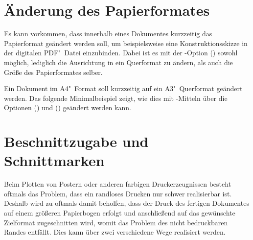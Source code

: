 \section{Änderung des Papierformates}
%
%
Es kann vorkommen, dass innerhalb eines Dokumentes kurzzeitig das Papierformat 
geändert werden soll, um beispielsweise eine Konstruktionsskizze in der 
digitalen PDF"~Datei einzubinden. Dabei ist es mit der \KOMAScript-Option 
() sowohl möglich, lediglich die 
Ausrichtung in ein Querformat zu ändern, als auch die Größe des Papierformates 
selber.
%
\begin{Example}
Ein Dokument im A4"~Format soll kurzzeitig auf ein A3"~Querformat geändert 
werden. Das folgende Minimalbeispiel zeigt, wie dies mit \KOMAScript-Mitteln 
über die Optionen () und 
() geändert werden kann.
\end{Example}



\section{Beschnittzugabe und Schnittmarken}
%
%
%
%
Beim Plotten von Postern oder anderen farbigen Druckerzeugnissen besteht 
oftmals das Problem, dass ein randloses Drucken nur schwer realisierbar ist. 
Deshalb wird zu oftmals damit beholfen, dass der Druck des fertigen Dokumentes 
auf einem größeren Papierbogen erfolgt und anschließend auf das gewünschte 
Zielformat zugeschnitten wird, womit das Problem des nicht bedruckbaren Randes 
entfällt. Dies kann über zwei verschiedene Wege realisiert werden.

